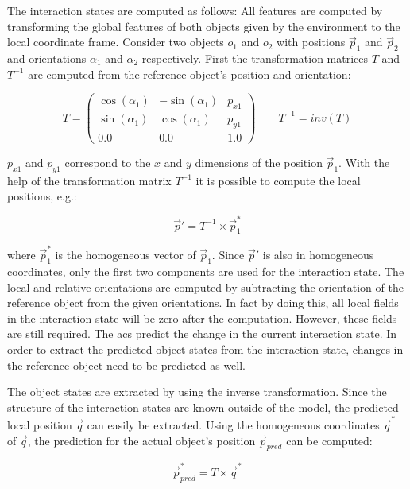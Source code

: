 The interaction states are computed as follows:
All features are computed by transforming the global features of both objects given by the environment to the local coordinate frame. Consider two objects $o_1$ and $o_2$ with positions $\vec{p}_1$ and $\vec{p}_2$ and orientations $\alpha_1$ and $\alpha_2$ respectively. First the transformation matrices $T$ and $T^{-1}$ are computed from the reference object's position and orientation:

\begin{equation}
T = \begin{pmatrix}
\cos(\alpha_1) & -\sin(\alpha_1) & p_{x1} \\
\sin(\alpha_1) & \cos(\alpha_1) & p_{y1} \\
0.0 & 0.0 & 1.0
\end{pmatrix}
\qquad
T^{-1} = inv(T)
\label{eq:transMatrix}
\end{equation}

$p_{x1}$ and $p_{y1}$ correspond to the $x$ and $y$ dimensions of the position $\vec{p}_1$. With the help of the transformation matrix $T^{-1}$ it is possible to compute the local positions, e.g.:

\begin{equation}
\vec{p}' = T^{-1} \times \vec{p}_1^*
\end{equation}

where $\vec{p}_1^*$ is the homogeneous vector of $\vec{p}_1$. Since $\vec{p}'$ is also in homogeneous coordinates, only the first two components are used for the interaction state. The local and relative orientations are computed by subtracting the orientation of the reference object from the given orientations. In fact by doing this, all local fields in the interaction state will be zero after the computation. However, these fields are still required. The \glspl{ac} predict the change in the current interaction state. In order to extract the predicted object states from the interaction state, changes in the reference object need to be predicted as well. 

The object states are extracted by using the inverse transformation. Since the structure of the interaction states are known outside of the model, the predicted local position $\vec{q}$ can easily be extracted. Using the homogeneous coordinates $\vec{q}^*$ of $\vec{q}$, the prediction for the actual object's position $\vec{p}_{pred}$ can be computed:

\begin{equation}
\vec{p}_{pred}^* = T \times \vec{q}^*
\end{equation}

